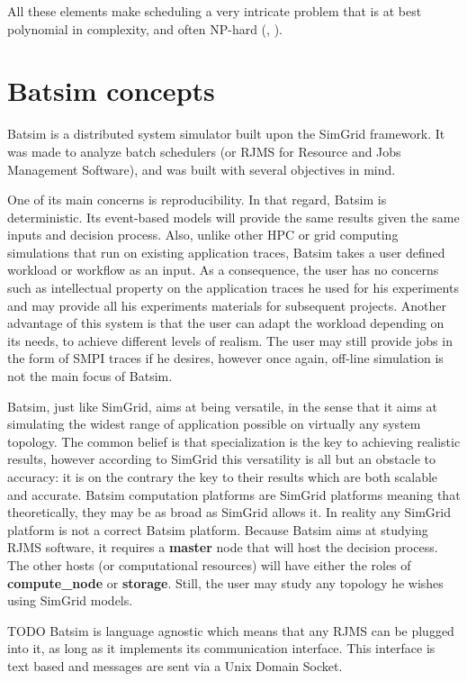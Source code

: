 \documentclass[12pt, a4paper]{memoir}
\begin{document}
All these elements make scheduling a very intricate problem that is at best
polynomial in complexity, and often NP-hard (\cite{10.1016/S0022-0000(75)80008-0}, \cite{scheduler-complexity}).

\section{Batsim concepts}

Batsim\cite{dutot:hal-01333471} is a distributed system simulator built upon
the SimGrid framework. It was made to analyze batch schedulers (or RJMS for
Resource and Jobs Management Software), and was built with several objectives in
mind.

One of its main concerns is reproducibility. In that regard, Batsim is
deterministic.  Its event-based models will provide the same results given the
same inputs and decision process. Also, unlike other HPC or grid computing
simulations that run on existing application traces, Batsim takes a user
defined workload or workflow as an input. As a consequence, the user has no
concerns such as intellectual property on the application traces he used for
his experiments and may provide all his experiments materials for subsequent
projects.  Another advantage of this system is that the user can adapt the
workload depending on its needs, to achieve different levels of realism. The
user may still provide jobs in the form of SMPI traces if he desires, however
once again, off-line simulation is not the main focus of Batsim.

Batsim, just like SimGrid, aims at being versatile, in the sense that it aims
at simulating the widest range of application possible on virtually  any system
topology. The common belief is that specialization is the key to achieving
realistic results, however according to SimGrid this versatility is all but an
obstacle to accuracy\cite{casanova:hal-01017319}: it is on the contrary the key
to their results which are both scalable and accurate. Batsim computation
platforms are SimGrid platforms meaning that theoretically, they may be as
broad as SimGrid allows it. In reality any SimGrid platform is not a correct
Batsim platform. Because Batsim aims at studying RJMS software, it requires a
\textbf{master} node that will host the decision process. The other hosts (or
computational resources) will have either the roles of \textbf{compute\_node}
or \textbf{storage}. Still, the user may study any topology he wishes using
SimGrid models.

TODO
Batsim is language agnostic which
means that any RJMS can be plugged into it, as long as it implements its
communication interface. This interface is text based and messages are sent via
a Unix Domain Socket.
\end{document}
